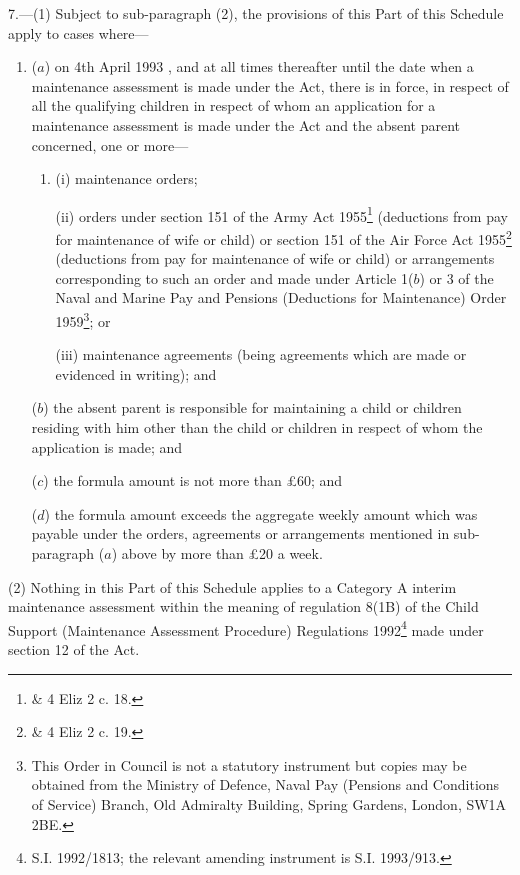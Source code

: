 \documentclass[a4paper]{article}
\begin{document}
7.—(1) Subject to sub-paragraph (2), the provisions of this Part of this Schedule apply to cases where—
\begin{enumerate}\item[]
($a$) on 4th April 1993%
, and at all times thereafter until the date when a maintenance assessment is made under the Act, %
 there is in force, in respect of all the qualifying children in respect of whom an application for a maintenance assessment is made under the Act and the absent parent concerned, one or more—
\begin{enumerate}\item[]
(i) maintenance orders;

(ii) orders under section 151 of the Army Act 1955\footnote{ \& 4 Eliz 2 c. 18.} (deductions from pay for maintenance of wife or child) or section 151 of the Air Force Act 1955\footnote{ \& 4 Eliz 2 c. 19.} (deductions from pay for maintenance of wife or child) or arrangements corresponding to such an order and made under Article 1($b$) or 3 of the Naval and Marine Pay and Pensions (Deductions for Maintenance) Order 1959\footnote{\frenchspacing This Order in Council is not a statutory instrument but copies may be obtained from the Ministry of Defence, Naval Pay (Pensions and Conditions of Service) Branch, Old Admiralty Building, Spring Gardens, London, SW1A 2BE.}; or

(iii) maintenance agreements (being agreements which are made or evidenced in writing); and
\end{enumerate}

($b$) the absent parent is responsible for maintaining a child or children residing with him other than the child or children in respect of whom the application is made; and

($c$) the formula amount is not more than £60; and

($d$) the formula amount exceeds the aggregate weekly amount which was payable under the orders, agreements or arrangements mentioned in sub-paragraph ($a$) above by more than £20 a week.
\end{enumerate}

(2) Nothing in this Part of this Schedule applies to 
a Category A interim maintenance assessment within the meaning of regulation 8(1B) of the Child Support (Maintenance Assessment Procedure) Regulations 1992\footnote{\frenchspacing S.I. 1992/1813; the relevant amending instrument is S.I. 1993/913.} %
made under section 12 of the Act.
\end{document}

